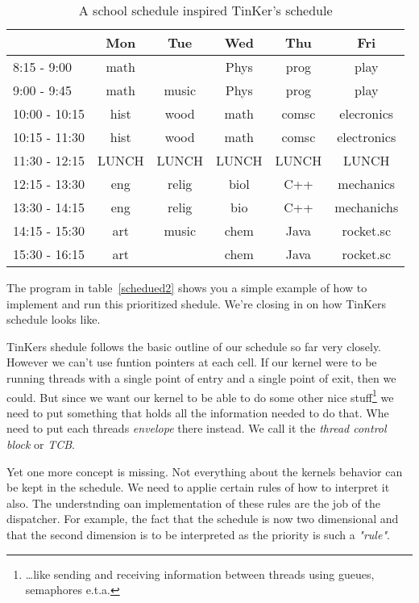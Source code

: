 \begin{table}[!hbp]
\begin{tabular}{|l|c|c|c|c|c|}
\hline
		& Mon 	& Tue	& Wed	& Thu	& Fri\\ \hline
 8:15 -  9:00 	& math	&	& Phys	& prog	& play\\
 9:00 -  9:45 	& math	& music	& Phys	& prog	& play\\
10:00 - 10:15 	& hist	& wood	& math	& comsc	& elecronics\\
10:15 - 11:30 	& hist	& wood	& math	& comsc	& electronics\\ \hline
11:30 - 12:15 	& LUNCH	& LUNCH	& LUNCH	& LUNCH	& LUNCH\\ \hline
12:15 - 13:30 	& eng	& relig	& biol	& C++	& mechanics\\
13:30 - 14:15 	& eng	& relig	& bio	& C++	& mechanichs\\
14:15 - 15:30 	& art	& music	& chem	& Java	& rocket.sc\\
15:30 - 16:15 	& art	&	& chem	& Java	& rocket.sc\\ \hline
\end{tabular}
\caption{A school schedule inspired TinKer's schedule}\label{school_schedule}
\end{table}


The program in table~\ref{schedued2} shows you a simple example of how to implement and run this prioritized shedule. We're closing in on how TinKers schedule looks like. 

TinKers shedule follows the basic outline of our schedule so far very closely. However we can't use funtion pointers at each cell. If our kernel were to be running threads with a single point of entry and a single point of exit, then we could. But since we want our kernel to be able to do some other nice stuff\footnote{\ldots{}like sending and receiving information between threads using gueues, semaphores e.t.a.} we need to put something that holds all the information needed to do that. Whe need to put each threads \textit{envelope} there instead. We call it the \textit{thread control block} or \textit{TCB}.

Yet one more concept is missing. Not everything about the kernels behavior can be kept in the schedule. We need to applie certain rules of how to interpret it also. The understnding oan implementation of these rules are the job of the dispatcher. For example, the fact that the schedule is now two dimensional and that the second dimension is to be interpreted as the priority is such a \textit{"rule"}. 

